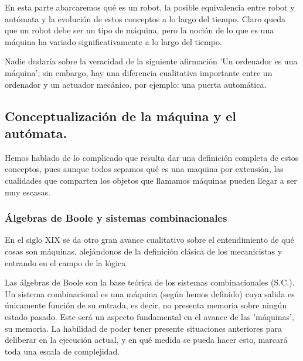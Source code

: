 


En esta parte abarcaremos qué es un robot, la posible equivalencia entre robot y autómata y la evolución de estos conceptos a lo largo del tiempo. Claro queda que un robot debe ser un tipo de máquina, pero la noción de lo que es una máquina ha variado significativamente a lo largo del tiempo. 

\vspace{10px}

Nadie dudaría sobre la veracidad de la siguiente afirmación 'Un ordenador es una máquina'; sin embargo, hay una diferencia cualitativa importante entre un ordenador y un actuador mecánico, por ejemplo: una puerta automática.


\vspace{10px}





\subsection{Conceptualización de la máquina y el autómata.}

Hemos hablado de lo complicado que resulta dar una definición completa de estos conceptos, pues aunque todos sepamos qué es una maquina por extensión, las cualidades que comparten los objetos que llamamos máquinas pueden llegar a ser muy escasas.

\subsubsection{Álgebras de Boole y sistemas combinacionales}

En el siglo XIX se da otro gran avance cualitativo sobre el entendimiento de qué cosas son máquinas, alejándonos de la definición clásica de los mecanicistas y entrando en el campo de la lógica.

\vspace{10px}

Las álgebras de Boole son la base teórica de los sistemas combinacionales (S.C.). Un sistema combinacional es una máquina (según hemos definido) cuya salida es únicamente función de su entrada, es decir, no presenta memoria sobre ningún estado pasado. Este será un aspecto fundamental en el avance de las 'máquinas', su memoria. La habilidad de poder tener presente situaciones anteriores para deliberar en la ejecución actual, y en qué medida se pueda hacer esto, marcará toda una escala de complejidad.

